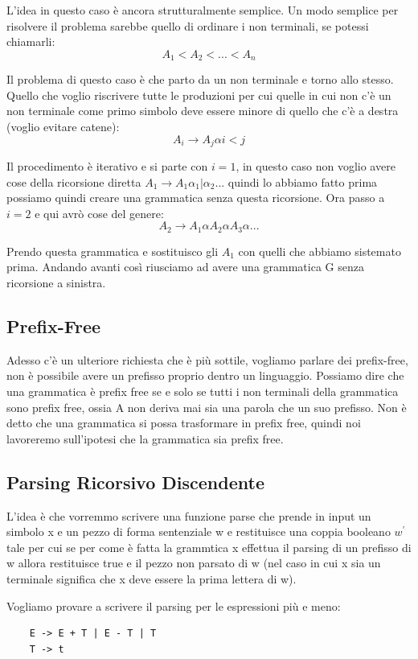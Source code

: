 L'idea in questo caso è ancora strutturalmente semplice. Un modo semplice per risolvere il problema sarebbe quello di ordinare i non terminali, se potessi chiamarli:
\[
A_1 < A_2 < ... < A_n
\]

Il problema di questo caso è che parto da un non terminale e torno allo stesso. Quello che voglio riscrivere tutte le produzioni per cui quelle in cui non c'è un non terminale come primo simbolo deve essere minore di quello che c'è a destra (voglio evitare catene):
\[
A_i \rightarrow A_j \alpha i < j
\]

Il procedimento è iterativo e si parte con $i = 1$, in questo caso non voglio avere cose della ricorsione diretta $A_1 \rightarrow A_1 \alpha_1 | \alpha_2 ...$ quindi lo abbiamo fatto prima possiamo quindi creare una grammatica senza questa ricorsione. Ora passo a $i=2$ e qui avrò cose del genere:
\[
A_2 \rightarrow A_1 \alpha A_2 \alpha A_3 \alpha ...
\]

Prendo questa grammatica e sostituisco gli $A_1$ con quelli che abbiamo sistemato prima. Andando avanti così riusciamo ad avere una grammatica G senza ricorsione a sinistra.

\subsection{Prefix-Free}

Adesso c'è un ulteriore richiesta che è più sottile, vogliamo parlare dei prefix-free, non è possibile avere un prefisso proprio dentro un linguaggio.
Possiamo dire che una grammatica è prefix free se e solo se tutti i non terminali della grammatica sono prefix free, ossia A non deriva mai sia una parola che un suo prefisso. Non è detto che una grammatica si possa trasformare in prefix free, quindi noi lavoreremo sull'ipotesi che la grammatica sia prefix free.

\subsection{Parsing Ricorsivo Discendente}
L'idea è che vorremmo scrivere una funzione parse che prende in input un simbolo x e un pezzo di forma sentenziale w e restituisce una coppia booleano $w^{'}$ tale per cui se per come è fatta la grammtica x effettua il parsing di un prefisso di w allora restituisce true e il pezzo non parsato di w (nel caso in cui x sia un terminale significa che x deve essere la prima lettera di w).

Vogliamo provare a scrivere il parsing per le espressioni più e meno:
\begin{lstlisting}
    E -> E + T | E - T | T
    T -> t
\end{lstlisting}

